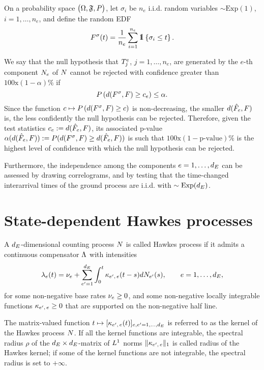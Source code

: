 \documentclass[10pt, article,table]{article}
\begin{document}
On a probability space $\probabilitySpace$, let $\sigma_i$ be $n_e$ i.i.d. random variables $\sim \text{Exp}(1)$, $i=1,\dots, n_e$, and define the random EDF 
\begin{equation*}
 F^{\sigma}(t) = \frac{1}{n_e}\sum_{i=1}^{n_e} \one \left\lbrace \sigma_i \leq t\right\rbrace.
\end{equation*}

We say that the null hypothesis that $\arrivalTimes_{j}$, $j=1, \dots, n_e$, are generated by the $e$-th component $\countingProc$ of $\multiCountingProc$ cannot be rejected with confidence greater than $100\text{x}(1-\alpha)\text{\%}$ if 
\begin{equation*}
 \Prob\left( d(F^\sigma, F) \geq c_e \right) \leq \alpha.
\end{equation*}
Since the function $c \mapsto \Prob\left( d(F^\sigma, F) \geq c \right)$ is non-decreasing, the smaller $d(\EDFfun, F)$ is, the less confidently the null hypothesis can be rejected. Therefore, given the test statistics $c_e:=d(\EDFfun, F)$, its associated p-value $\alpha(d(\EDFfun,F)) := \Prob(d(F^\sigma, F) \geq d(\EDFfun,F))$ is such that $100\text{x}(1-\text{p-value})\text{\%}$ is the highest level of confidence with which the null hypothesis can be rejected.

Furthermore, the independence among the components $e=1,\dots, \numEventTypes$ can be assessed by drawing correlograms, and by testing that the time-changed interarrival times of the ground process are i.i.d. with $\sim \text{Exp}(\numEventTypes)$.

\section{State-dependent Hawkes processes}
A $\numEventTypes$-dimensional counting process $\multiCountingProc$ is called Hawkes process if it admits a continuous compensator $\compensator$ with intensities 
\begin{equation}\label{eq.intensity_ordHawkes}
 \intensity(t) = \baseRate_e + \sum_{\eone=1}^{\numEventTypes}\intzerot \hawkesKernel\subscriptee(t-s)d\countingProc[\eone](s), \qquad e=1,\dots,\numEventTypes,
\end{equation}
for some non-negative base rates $\baseRate_e \geq 0$, and some non-negative locally integrable functions $\hawkesKernel\subscriptee \geq 0$ that are supported on the non-negative half line.

The matrix-valued function $t\mapsto [\hawkesKernel\subscriptee(t)]_{e,\eone = 1, \dots, \numEventTypes}$ is referred to as the kernel of the Hawkes process $\multiCountingProc$.  If all the kernel functions are integrable, the spectral radius $\rho$ of the $\numEventTypes\times\numEventTypes$-matrix of $\Lone$ norms $\Vert \hawkesKernel\subscriptee \Vert_{1}$ is called radius of the Hawkes kernel; if some of the kernel functions are not integrable, the spectral radius is set to $+\infty$.  
\end{document}
